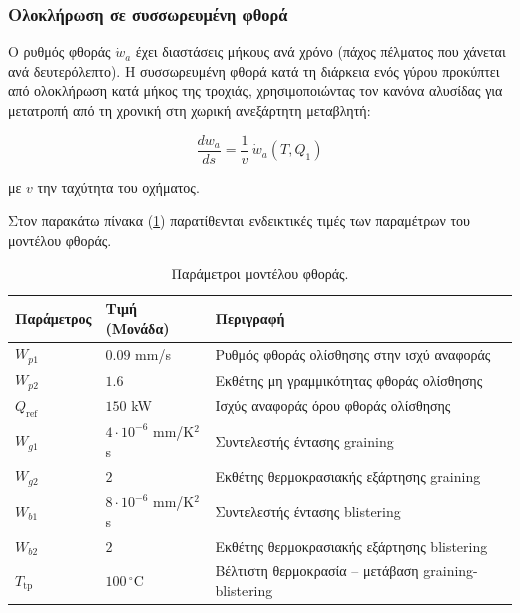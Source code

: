 \subsubsection{Ολοκλήρωση σε συσσωρευμένη φθορά}

Ο ρυθμός φθοράς $\dot{w}_a$ έχει διαστάσεις μήκους ανά χρόνο (πάχος πέλματος που χάνεται ανά
δευτερόλεπτο). Η συσσωρευμένη φθορά κατά τη διάρκεια ενός γύρου προκύπτει από
ολοκλήρωση κατά μήκος της τροχιάς, χρησιμοποιώντας τον κανόνα αλυσίδας για μετατροπή από
τη χρονική στη χωρική ανεξάρτητη μεταβλητή:

\begin{equation}
    \frac{dw_a}{ds} = \frac{1}{v}\, \dot{w}_a(T, Q_1)
    \label{eq:dwds}
\end{equation}

με $v$ την ταχύτητα του οχήματος.


Στον παρακάτω πίνακα (\ref{tab:params_wear}) παρατίθενται ενδεικτικές τιμές των παραμέτρων του μοντέλου φθοράς.

\begin{table}[htbp]
    \centering
    \small
    \renewcommand{\arraystretch}{1.2}
    \begin{tabular}{@{}l l l@{}}
        \toprule
        \textbf{Παράμετρος} & \textbf{Τιμή (Μονάδα)} & \textbf{Περιγραφή} \\
        \midrule
        $W_{p1}$             & $0.09$ mm/s                 & Ρυθμός φθοράς ολίσθησης στην ισχύ αναφοράς \\
        $W_{p2}$             & $1.6$                       & Εκθέτης μη γραμμικότητας φθοράς ολίσθησης \\
        $Q_{\mathrm{ref}}$   & $150$ kW                    & Ισχύς αναφοράς όρου φθοράς ολίσθησης\\
        $W_{g1}$             & $4 \cdot 10^{-6}$ mm/K$^2$s & Συντελεστής έντασης graining \\
        $W_{g2}$             & $2$                         & Εκθέτης θερμοκρασιακής εξάρτησης graining \\
        $W_{b1}$             & $8 \cdot 10^{-6}$ mm/K$^2$s & Συντελεστής έντασης blistering \\
        $W_{b2}$             & $2$                         & Εκθέτης θερμοκρασιακής εξάρτησης blistering \\
        $T_{\mathrm{tp}}$    & $100\,^\circ\mathrm{C}$     & Βέλτιστη θερμοκρασία -- μετάβαση graining-blistering \\
        \bottomrule
    \end{tabular}
    \caption{Παράμετροι μοντέλου φθοράς.}
    \label{tab:params_wear}
\end{table}
